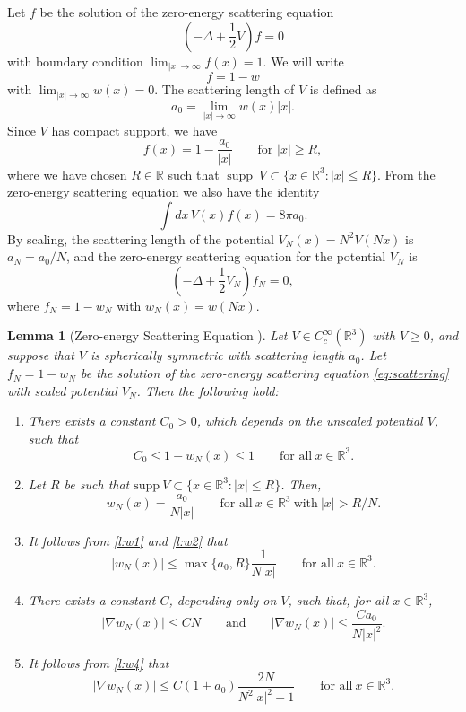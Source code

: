 \documentclass[11pt,a4paper,DIV11]{scrartcl}	%
\newtheorem{lem}[thm]{Lemma}
\newcommand{\R}{\mathds{R}}
\newcommand{\Rbb}{\mathbb{R}}		%
\begin{document}
Let $f$ be the solution of the zero-energy scattering equation
\[
  \left( -\Delta + \frac{1}{2} V \right) f = 0
\]
with boundary condition $\lim_{|x|\to\infty} f(x) = 1$. We will write
\[
  f = 1 - w
\]
with $\lim_{|x|\to\infty} w(x) = 0$. The scattering length of $V$ is defined
as
\[
  a_0 = \lim_{|x| \to \infty} w(x)|x|.
\]
Since $V$ has compact support, we have
\[
  f(x) = 1 - \frac{a_0}{|x|} \qquad \text{for } |x| \ge R,
\]
where we have chosen $R \in \Rbb$ such that $\operatorname{supp} \ V \subset
\{ x \in \R^3: |x| \le R \}$. From the zero-energy scattering equation we
also have the identity
\[
  \int dx \, V(x) f(x) = 8 \pi a_0.
\]
By scaling, the scattering length of the potential $V_N(x) = N^2 V(Nx)$ is
$a_N = a_0/N$, and the zero-energy scattering equation for the potential $V_N$
is
\begin{equation} \label{eq:scattering}
  \left( -\Delta + \frac{1}{2} V_N \right) f_N = 0,
\end{equation}
where $f_N = 1 - w_N$ with $w_N(x) = w(Nx)$.


\begin{lem}[Zero-energy Scattering Equation \cite{ESY2010}] \label{l:w}
  Let $V \in C_c^\infty(\R^3)$ with $V \ge 0$, and suppose that $V$ is
  spherically symmetric with scattering length $a_0$. Let $f_N = 1 - w_N$ be
  the solution of the zero-energy scattering equation \eqref{eq:scattering}
  with scaled potential $V_N$. Then the following hold:%
  \begin{enumerate}
    \item \label{l:w1} There exists a constant $C_0 > 0$, which depends on
    the unscaled potential $V$, such that
      \[
        C_0 \le 1 - w_N(x) \le 1 \qquad \text{for all} \ x \in \R^3.
      \]
    \item \label{l:w2} Let $R$ be such that $\text{supp} \ V \subset \{ x
    \in \R^3 : |x| \le R \}$. Then,
      \[
        w_N(x) = \frac{a_0}{N|x|} \qquad \text{for all} \ x \in \R^3 \
        \text{with} \ |x| > R/N.
      \]
    \item \label{l:w3} It follows from \ref{l:w1} and \ref{l:w2} that
      \[
        |w_N(x)| \le \max\{a_0, R\} \frac{1}{N|x|} \qquad \text{for all} \ x
        \in \R^3.
      \]
    \item \label{l:w4} There exists a constant $C$, depending only on
      $V$, such that, for all $x \in \R^3$,
      \[
        \lvert\nabla w_N(x)\rvert \le C N \qquad \mbox{and} \qquad |\nabla w_N(x)| \le \frac{C a_0}{N |x|^2}.%
      \]
    \item \label{l:w5} It follows from \ref{l:w4} that
      \[
        |\nabla w_N(x)| \le C(1+ a_0) \frac{2N}{N^2|x|^2 + 1}
        \qquad \text{for all} \ x \in \R^3.
      \]
  \end{enumerate}
\end{lem}
\end{document}

